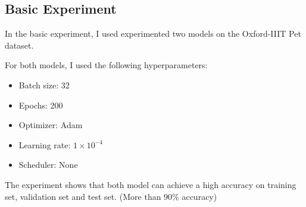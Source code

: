 \subsection{Basic Experiment}

In the basic experiment, I used experimented two models on the Oxford-IIIT Pet dataset.

For both models, I used the following hyperparameters:
\begin{itemize}
    \item Batch size: 32
    \item Epochs: 200
    \item Optimizer: Adam
    \item Learning rate: $1 \times 10^{-4}$
    \item Scheduler: None
\end{itemize}

The experiment shows that both model can achieve a high accuracy on training set, validation set and test set. (More than 90\% accuracy)
